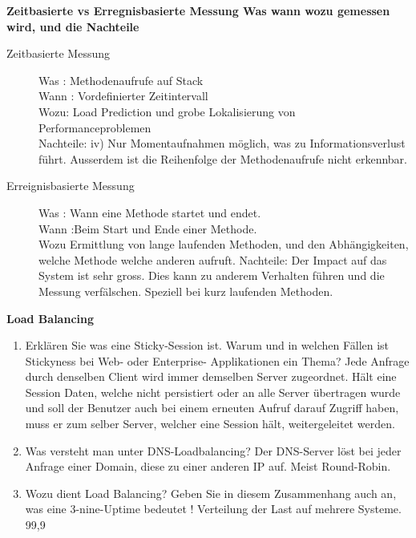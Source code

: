 \documentclass[a4paper,10pt]{scrreprt}
\begin{document}
 \textbf{Zeitbasierte vs Erregnisbasierte Messung  Was wann wozu gemessen wird, und die Nachteile}
\begin{description}
	\item[Zeitbasierte Messung] Was : Methodenaufrufe auf Stack \\ Wann : Vordefinierter Zeitintervall\\ Wozu: Load Prediction und grobe Lokalisierung von Performanceproblemen \\ Nachteile: iv) Nur Momentaufnahmen möglich, was zu Informationsverlust führt. Ausserdem ist die Reihenfolge der
Methodenaufrufe nicht erkennbar. 
\item[Erreignisbasierte Messung] Was : Wann eine Methode startet und endet.\\
Wann :Beim Start und Ende einer Methode.\\
Wozu Ermittlung von lange laufenden Methoden, und den Abhängigkeiten, welche Methode welche anderen aufruft.
Nachteile: Der Impact auf das System ist sehr gross. Dies kann zu anderem Verhalten führen und die Messung verfälschen.
Speziell bei kurz laufenden Methoden.\\
\end{description}

\textbf{Load Balancing}
\begin{enumerate}
	
\item  Erklären Sie was eine Sticky-Session ist. Warum und in welchen Fällen ist Stickyness bei Web- oder Enterprise-
Applikationen ein Thema?
Jede Anfrage durch denselben Client wird immer demselben Server zugeordnet. Hält eine Session Daten, welche nicht
persistiert oder an alle Server übertragen wurde und soll der Benutzer auch bei einem erneuten Aufruf darauf Zugriff
haben, muss er zum selber Server, welcher eine Session hält, weitergeleitet werden.
\item  Was versteht man unter DNS-Loadbalancing?
Der DNS-Server löst bei jeder Anfrage einer Domain, diese zu einer anderen IP auf. Meist Round-Robin.
\item  Wozu dient Load Balancing? Geben Sie in diesem Zusammenhang auch an, was eine 3-nine-Uptime bedeutet !
Verteilung der Last auf mehrere Systeme. 99,9%
\end{enumerate}
\end{document}
